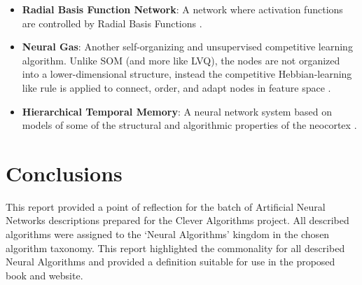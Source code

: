 \documentclass[a4paper, 11pt]{article}
\begin{document}
\begin{itemize}
	\item \textbf{Radial Basis Function Network}: A network where activation functions are controlled by Radial Basis Functions \cite{Howlett2001}.
	\item \textbf{Neural Gas}: Another self-organizing and unsupervised competitive learning algorithm. Unlike SOM (and more like LVQ), the nodes are not organized into a lower-dimensional structure, instead the competitive Hebbian-learning like rule is applied to connect, order, and adapt nodes in feature space \cite{Martinetz1991, Martinetz1993, Martinetz1994}.
	\item \textbf{Hierarchical Temporal Memory}: A neural network system based on models of some of the structural and algorithmic properties of the neocortex \cite{Hawkins2005}.
\end{itemize}

% 
% 
\section{Conclusions}
\label{sec:conclusions}
This report provided a point of reflection for the batch of Artificial Neural Networks descriptions prepared for the Clever Algorithms project. All described algorithms were assigned to the `Neural Algorithms' kingdom in the chosen algorithm taxonomy. This report highlighted the commonality for all described Neural Algorithms and provided a definition suitable for use in the proposed book and website.



\end{document}
